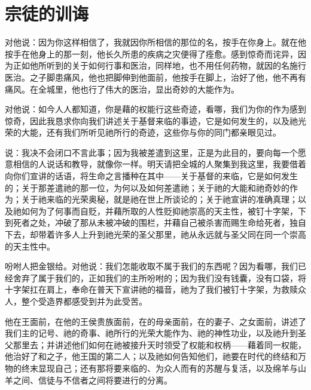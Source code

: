 
\chapter{宗徒的训诲}


对他说：因为你这样相信了，我就因你所相信的那位的名，按手在你身上。就在他按手在他身上的那一刻，他长久所患的疾病之灾便得了痊愈。感到惊奇而诧异，因为正如他所听到的关于如何行事和医治，同样地，也不用任何药物，就因的名施行医治。之子脚患痛风，他也把脚伸到他面前，他按手在脚上，治好了他，他不再有痛风。在全城里，他也行了伟大的医治，显出奇妙的大能作为。\par

对他说：如今人人都知道，你是藉的权能行这些奇迹，看哪，我们为你的作为感到惊奇，因此我恳求你向我们讲述关于基督来临的事迹，它是如何发生的，以及祂光荣的大能，还有我们所听见祂所行的奇迹，这些你与你的同门都亲眼见过。\par

说：我决不会闭口不言此事；因为我被差遣到这里，正是为此目的，要向每一个愿意相信的人说话和教导，就像你一样。明天请把全城的人聚集到我这里，我要借着向你们宣讲的话语，将生命之言播种在其中——关于基督的来临，它是如何发生的；关于那差遣祂的那一位，为何以及如何差遣祂；关于祂的大能和祂奇妙的作为；关于祂来临的光荣奥秘，就是祂在世上所谈论的；关于祂宣讲的准确真理；以及祂如何为了何事而自贬，并藉所取的人性贬抑祂崇高的天主性，被钉十字架，下到死者之处，冲破了那从未被冲破的围栏，并藉自己被杀害而赐生命给死者，独自下去，却带着许多人上升到祂光荣的圣父那里，祂从永远就与圣父同在同一个崇高的天主性中。\par

吩咐人把金银给。对他说：我们怎能收取不属于我们的东西呢？因为看哪，我们已经舍弃了属于我们的，正如我们的主所吩咐的；因为我们没有钱囊，没有口袋，将十字架扛在肩上，奉命在普天下宣讲祂的福音，祂为了我们被钉十字架，为救赎众人，整个受造界都感受到并为此受苦。\par

他在王面前，在他的王侯贵族面前，在的母亲面前，在的妻子、之女面前，讲述了我们主的记号、祂的奇事、祂所行的光荣大能作为、祂的神性功业，以及祂升到圣父那里去；并讲述他们如何在祂被接升天时领受了权能和权柄——藉着同一权能，他治好了和之子，他王国的第二人；以及祂如何告知他们，祂要在时代的终结和万物的终末显现自己；还有那将要来临的、为众人而有的苏醒与复活，以及绵羊与山羊之间、信徒与不信者之间将要进行的分离。\par

